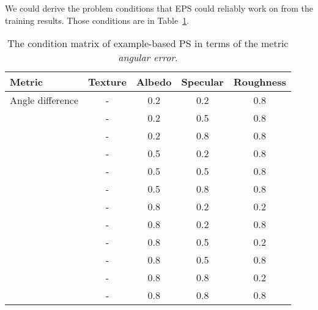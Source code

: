 We could derive the problem conditions that EPS could reliably work on from the training results. Those conditions are in Table~\ref{tab:ps_training_result}.
\begin{table}[!htbp]
  \centering
  \begin{tabular}{l*{4}{c}}
  \hline
  \textbf{Metric} & Texture & Albedo & Specular & Roughness\\
  \hline
  Angle difference & - & 0.2 & 0.2 & 0.8\\
                   & - & 0.2 & 0.5 & 0.8\\
                   & - & 0.2 & 0.8 & 0.8\\
                   & - & 0.5 & 0.2 & 0.8\\
                   & - & 0.5 & 0.5 & 0.8\\
                   & - & 0.5 & 0.8 & 0.8\\
                   & - & 0.8 & 0.2 & 0.2\\ %
                   & - & 0.8 & 0.2 & 0.8\\
                   & - & 0.8 & 0.5 & 0.2\\
                   & - & 0.8 & 0.5 & 0.8\\
                   & - & 0.8 & 0.8 & 0.2\\ %
                   & - & 0.8 & 0.8 & 0.8\\
  \hline
  \end{tabular}
  \caption{The condition matrix of example-based PS in terms of the metric \textit{angular error}.}
  \label{tab:ps_training_result}
\end{table}

